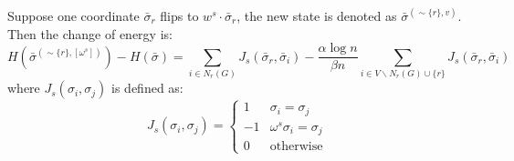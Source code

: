 \documentclass{article}
\begin{document}
	Suppose one coordinate $\bar{\sigma}_r$ flips to $w^s \cdot \bar{\sigma}_r$, the new state is denoted as $\bar{\sigma}^{(\sim \{r\}, v)}$.
	Then the change of energy is:
	\begin{equation}\label{eq:delta_H}
	 H(\bar{\sigma}^{(\sim \{r\}, [\omega^s])}) - H(\bar{\sigma}) = \sum_{i \in N_r(G)} J_s(\bar{\sigma}_r, \bar{\sigma}_i) - \frac{\alpha \log n}{\beta n} \sum_{i \in V\backslash N_r(G)\cup\{r\}} J_s(\bar{\sigma}_r,\bar{\sigma}_i)
	\end{equation}
	where $J_s(\sigma_i, \sigma_j)$ is defined as:
	\begin{equation}
	J_s(\sigma_i, \sigma_j) = \begin{cases}
	1 & \sigma_i = \sigma_j \\
	-1 & \omega^s \sigma_i = \sigma_j \\
	0 & \textrm {otherwise}
	\end{cases}
	\end{equation}
\end{document}
